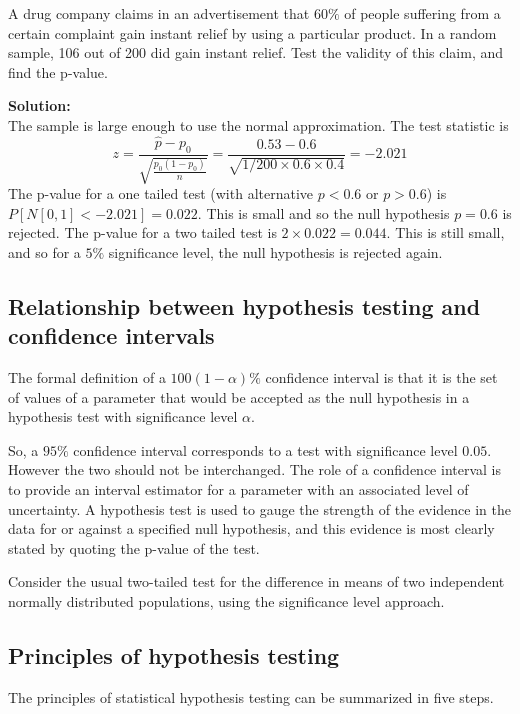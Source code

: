 \documentclass[12pt]{article}
\newenvironment{example}[1][Example:]{\begin{trivlist}
\item[\hskip \labelsep {\bfseries #1}]}{\end{trivlist}}
\begin{document}
\begin{example}
A drug company claims in an advertisement that $60\%$ of people suffering from a certain complaint gain instant relief by using a particular product. In a random sample, 106 out of 200 did gain instant relief. Test the validity of this claim, and find the p-value.
\end{example}

\begin{mdframed}
{\bf Solution:}\\
The sample is large enough to use the normal approximation. The test statistic is $$z=\frac{\hat{p}-p_0}{\sqrt{\frac{p_0(1-p_0)}{n}}}=\frac{0.53-0.6}{\sqrt{1/200 \times 0.6 \times 0.4}}=-2.021$$
The p-value for a one tailed test (with alternative $p<0.6$ or $p>0.6$) is $P[N[0,1]<-2.021]=0.022$. This is small and so the null hypothesis $p=0.6$ is rejected. The p-value for a two tailed test is $2 \times 0.022=0.044$. This is still small, and so for a $5\%$ significance level, the null hypothesis is rejected again.
\end{mdframed}

\subsection{Relationship between hypothesis testing and confidence intervals}
The formal definition of a $100(1-\alpha)\%$ confidence interval is that it is the set of values of a parameter that would be accepted as the null hypothesis in a hypothesis test with significance level $\alpha.$

So, a $95\%$ confidence interval corresponds to a test with significance level $0.05.$ However the two should not be interchanged. The role of a confidence interval is to provide an interval estimator for a parameter with an associated level of uncertainty. A hypothesis test is used to gauge the strength of the evidence in the data for or against a specified null hypothesis, and this evidence is most clearly stated by quoting the p-value of the test.

\begin{mdframed}
Consider the usual two-tailed test for the difference in means of two independent normally distributed populations, using the significance level approach.
\textcolor[rgb]{1.00,1.00,1.00}{\lipsum[1-6]}
\end{mdframed}


\subsection{Principles of hypothesis testing}
The principles of statistical hypothesis testing can be summarized in five steps.
\end{document}
